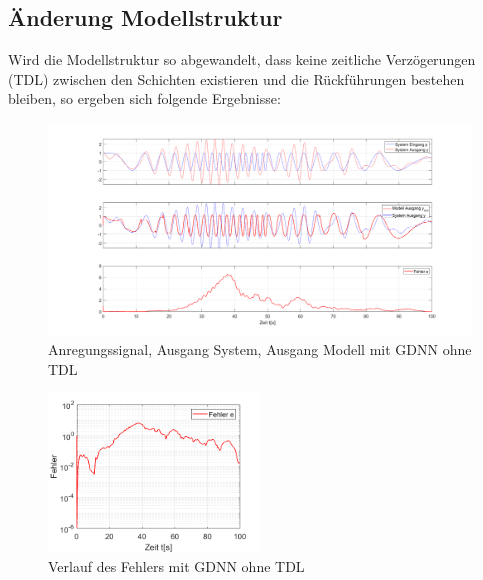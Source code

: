 \documentclass[paper=a4, fontsize=11pt]{scrartcl} %
\numberwithin{equation}{section} %
\numberwithin{figure}{section} %
\numberwithin{table}{section} %
\begin{document}
\subsection{Änderung Modellstruktur}
Wird die Modellstruktur so abgewandelt, dass keine zeitliche Verzögerungen (TDL) zwischen den Schichten existieren und die Rückführungen bestehen bleiben, so ergeben sich folgende Ergebnisse:
\begin{figure}[!h]
	\centering
		\includegraphics[width=1.00\textwidth]{./GDNN_ohneTDL_Identifikation.png}
	\caption{Anregungssignal, Ausgang System, Ausgang Modell mit GDNN ohne TDL}
	\label{fig:GDNN_ohneTDL}
\end{figure}

\begin{figure}[!h]
	\centering
		\includegraphics[width=0.5\textwidth]{./GDNN_ohneTDL_Identifikation_2.png}
	\caption{Verlauf des Fehlers mit GDNN ohne TDL}
	\label{fig:GDNN_ohneTDL2}
\end{figure}
\newpage
\end{document}
